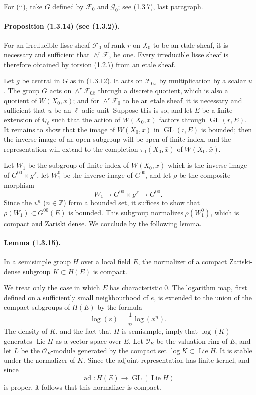 \documentclass[11pt]{article}
\theoremstyle{remark}
\newcommand{\Ql}{\mathbb{Q}_\ell}
\newcommand{\ZZ}{\mathbb{Z}}
\newcommand{\GL}{\operatorname{GL}}
\newcommand{\Lie}{\operatorname{Lie}}
\newcommand{\ad}{\operatorname{ad}}
\begin{document}
For (ii), take $G$ defined by $\mathcal F_0$ and $\mathcal G_0$; see (1.3.7), last paragraph.

\paragraph{Proposition (1.3.14) (see (1.3.2)).} For an irreducible lisse sheaf $\mathcal F_0$ of rank $r$ on $X_0$ to be an etale sheaf, it is necessary and sufficient that $\wedge^r\mathcal F_0$ be one. Every irreducible lisse sheaf is therefore obtained by torsion (1.2.7) from an etale sheaf.

Let $g$ be central in $G$ as in (1.3.12). It acts on $\mathcal F_{0\bar x}$ by multiplication by a scalar $u$. The group $G$ acts on $\wedge^r\mathcal F_{0\bar x}$ through a discrete quotient, which is also a quotient of $W(X_0,\bar x)$; and for $\wedge^r\mathcal F_0$ to be an etale sheaf, it is necessary and sufficient that $u$ be an $\ell$-adic unit. Suppose this is so, and let $E$ be a finite extension of $\Ql$ such that the action of $W(X_0,\bar x)$ factors through $\GL(r,E)$. It remains to show that the image of $W(X_0,\bar x)$ in $\GL(r,E)$ is bounded; then the inverse image of an open subgroup will be open of finite index, and the representation will extend to the completion $\pi_1(X_0,\bar x)$ of $W(X_0,\bar x)$.

Let $W_1$ be the subgroup of finite index of $W(X_0,\bar x)$ which is the inverse image of $G^{00}\times g^\ZZ$, let $W_1^0$ be the inverse image of $G^{00}$, and let $\rho$ be the composite morphism
\[
W_1\longrightarrow G^{00}\times g^\ZZ\longrightarrow G^{00}.
\]
Since the $u^n$ ($n\in\ZZ$) form a bounded set, it suffices to show that $\rho(W_1)\subset G^{00}(E)$ is bounded. This subgroup normalizes $\rho(W_1^0)$, which is compact and Zariski dense. We conclude by the following lemma.

\paragraph{Lemma (1.3.15).} In a semisimple group $H$ over a local field $E$, the normalizer of a compact Zariski-dense subgroup $K\subset H(E)$ is compact.

We treat only the case in which $E$ has characteristic $0$. The logarithm map, first defined on a sufficiently small neighbourhood of $e$, is extended to the union of the compact subgroups of $H(E)$ by the formula
\[
\log(x)=\frac1n\log(x^n).
\]
The density of $K$, and the fact that $H$ is semisimple, imply that $\log(K)$ generates $\Lie H$ as a vector space over $E$. Let $\mathcal O_E$ be the valuation ring of $E$, and let $L$ be the $\mathcal O_E$-module generated by the compact set $\log K\subset\Lie H$. It is stable under the normalizer of $K$. Since the adjoint representation has finite kernel, and since
\[
\ad:H(E)\longrightarrow\GL(\Lie H)
\]
is proper, it follows that this normalizer is compact.
\end{document}
